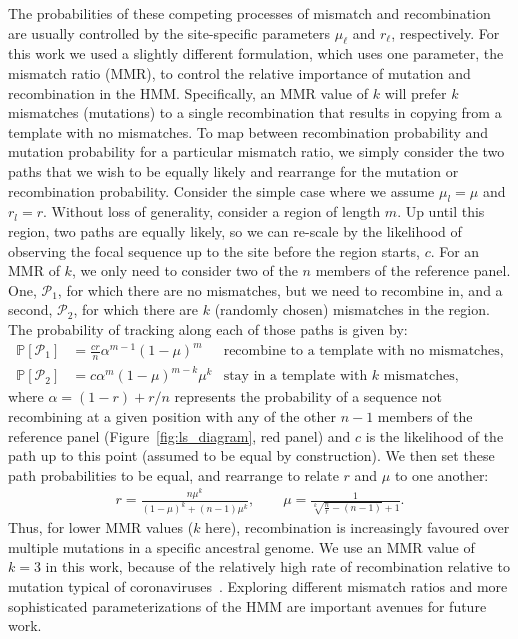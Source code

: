 \documentclass{article}
\begin{document}
The probabilities of these competing processes of mismatch and recombination are
usually controlled by the site-specific parameters $\mu_\ell$ and $r_\ell$,
respectively. For this work we used a slightly different formulation, which
uses one parameter, the mismatch ratio (MMR), to control the relative
importance of mutation and recombination in the HMM. Specifically, an MMR value
of $k$ will prefer $k$ mismatches (mutations) to a single recombination that
 results in copying from a template with no mismatches. To map between
recombination probability and mutation probability for a particular mismatch
ratio, we simply consider the two paths that we wish to be equally likely and
rearrange for the mutation or recombination probability. Consider the simple
case where we assume $\mu_l=\mu$ and $r_l=r$. Without loss of generality,
consider a region of length $m$. Up until this region, two paths are equally
likely, so we can re-scale by the likelihood of observing the focal sequence up
to the site before the region starts, $c$. For an MMR of $k$, we only need to
consider two of the $n$ members of the reference panel.
One, $\mathcal{P}_1$,
for which there are no mismatches, but we need to recombine in, and a second,
$\mathcal{P}_2$, for which there are $k$ (randomly chosen) mismatches in the
region.
The probability of tracking along each of those paths is given by:
\begin{align*}
\mathbb{P}[\mathcal{P}_1] &= \frac{cr}{n}
\alpha^{m-1}\left(1-\mu\right)^m
&\text{recombine to a template with no mismatches,}\\
\mathbb{P}[\mathcal{P}_2] &= c
\alpha^{m}
\left(1-\mu\right)^{m-k}\mu^k &\text{stay in a template with $k$ mismatches,}
\end{align*}
where $\alpha = (1 - r) + r/n$ represents the probability of a sequence not recombining at a
given position with any of the other $n-1$ members of the reference panel
(Figure~\ref{fig:ls_diagram}, red panel) and $c$ is the
likelihood of the path up to this point (assumed to be
equal by construction).
We then
set these path probabilities to be equal, and rearrange to relate $r$ and $\mu$ to one another:
\begin{align*} r = \frac{n\mu^k}{\left(1-\mu\right)^k + \left(n-1\right)\mu^k},
\quad\quad \mu = \frac{1}{\sqrt[k]{\frac{n}{r} - (n-1)} + 1}. \end{align*}
Thus, for lower MMR values ($k$ here),
recombination is increasingly favoured over multiple mutations in a specific ancestral genome.
We use an MMR value of $k=3$ in this work,
because of the relatively high rate of recombination relative
to mutation typical of
coronaviruses~\citep{amoutzias2022remarkable}.
Exploring different mismatch ratios and more sophisticated parameterizations
of the HMM are important avenues for future work.
\end{document}
